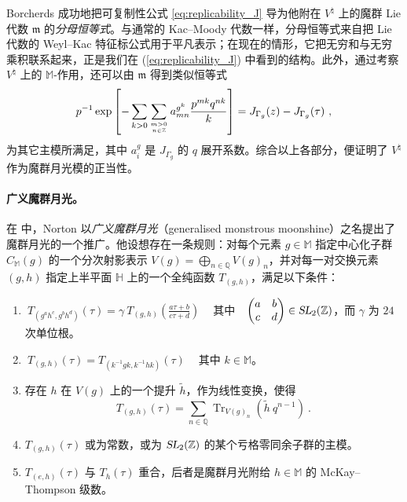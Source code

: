 \documentclass[11pt,a4paper,fontset=windows]{ctexart}
\numberwithin{equation}{section}
\newcommand{\SL}{\operatorname{\textsl{SL}}}      %
\newcommand{\myparagraph}[1]{\paragraph{#1}\mbox\\}
\newcommand{\QQ}{\mathbb{Q}}
\newcommand{\HH}{\mathbb{H}}
\newcommand{\ZZ}{\mathbb{Z}}
\newcommand{\MM}{\mathbb{M}}
\newcommand{\tr}{\operatorname{Tr}}
\newcommand{\eq}[1]{(\ref{#1})}
\begin{document}
Borcherds 成功地把可复制性公式 \eqref{eq:replicability_J} 导为他附在 $V^\natural$ 上的魔群 Lie 代数 $\mathfrak{m}$ 的\emph{分母恒等式}。与通常的 Kac–Moody 代数一样，分母恒等式来自把 Lie 代数的 Weyl–Kac 特征标公式用于平凡表示；在现在的情形，它把无穷和与无穷乘积联系起来，正是我们在 \eq{eq:replicability_J} 中看到的结构。此外，通过考察 $V^\natural$ 上的 $\MM$-作用，还可以由 $\mathfrak{m}$ 得到类似恒等式
\begin{equation}
\label{eq:replicability_T}
p^{-1}\exp\left[-\sum_{k>0}\sum_{m>0\atop n\in\ZZ} a_{mn}^{g^k}\frac{p^{mk}q^{nk}}{k}\right]=J_{\Gamma_g}(z)-J_{\Gamma_g}(\tau)~,
\end{equation}
为其它主模所满足，其中 $a_i^g$ 是 $J_{\Gamma_g}$ 的 $q$ 展开系数。综合以上各部分，便证明了 $V^\natural$ 作为魔群月光模的正当性。


\myparagraph{广义魔群月光。}
在 \cite{generalized_moonshine} 中，Norton 以\emph{广义魔群月光}（generalised monstrous moonshine）之名提出了魔群月光的一个推广。他设想存在一条规则：对每个元素 $g\in\MM$ 指定中心化子群 $C_\MM(g)$ 的一个分次射影表示 $V(g)=\bigoplus_{n\in\QQ}V(g)_n$，并对每一对交换元素 $(g,h)$ 指定上半平面 $\HH$ 上的一个全纯函数 $T_{(g,h)}$，满足以下条件：
\begin{enumerate}[label=(\roman*)]
\item 
$~T_{\left(g^ah^c,g^bh^d\right)}(\tau)=\gamma ~T_{(g,h)}\left(\frac{a\tau+b}{c\tau+d}\right)~~~~$ 其中 $~~\begin{pmatrix} a &b \\ c&d\end{pmatrix}\in\SL_2(\ZZ)$，而 $\gamma$ 为 $24$ 次单位根。
\item $~T_{\left(g,h\right)}(\tau)=T_{\left(k^{-1}gk,k^{-1}hk\right)}(\tau)~~~~$ 其中 $k\in\MM$。
\item 存在 $h$ 在 $V(g)$ 上的一个提升 $\tilde{h}$，作为线性变换，使得
\begin{equation}
T_{(g,h)}(\tau)=\sum_{n\in\QQ}\tr_{V(g)_n}\left(\tilde{h}~q^{n-1}\right)~.
\end{equation}
\item \label{haupt} $T_{(g,h)}(\tau)$ 或为常数，或为 $\SL_2(\ZZ)$ 的某个亏格零同余子群的主模。
\item $T_{(e,h)}(\tau)$ 与 $T_h(\tau)$ 重合，后者是魔群月光附给 $h\in\MM$ 的 McKay–Thompson 级数。
\end{enumerate}
\end{document}
